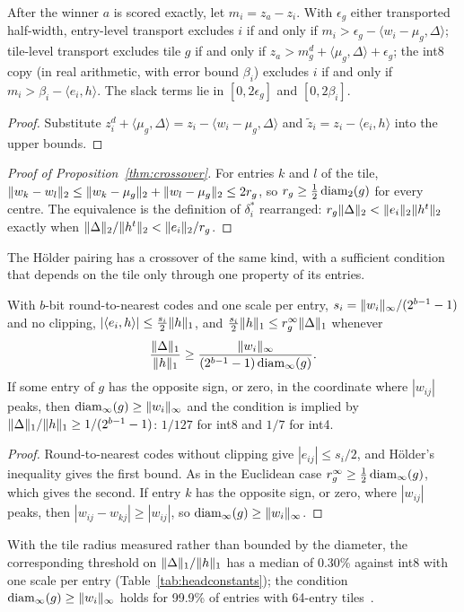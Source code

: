\begin{proposition}\label{prop:exclusion}
After the winner $a$ is scored exactly, let $m_i=z_a-z_i$. With $\epsilon_g$ either transported half-width, entry-level transport excludes $i$ if and only if $m_i>\epsilon_g-\langle w_i-\mu_g,\Delta\rangle$; tile-level transport excludes tile $g$ if and only if $z_a>m^d_g+\langle\mu_g,\Delta\rangle+\epsilon_g$; the int8 copy (in real arithmetic, with error bound $\beta_i$) excludes $i$ if and only if $m_i>\beta_i-\langle e_i,h\rangle$. The slack terms lie in $[0,2\epsilon_g]$ and $[0,2\beta_i]$.
\end{proposition}
\begin{proof}
Substitute $z_i^d+\langle\mu_g,\Delta\rangle=z_i-\langle w_i-\mu_g,\Delta\rangle$ and $\tilde z_i=z_i-\langle e_i,h\rangle$ into the upper bounds.
\end{proof}

\begin{proof}[Proof of Proposition~\ref{thm:crossover}]
For entries $k$ and $l$ of the tile, $\lVert w_k-w_l\rVert_2\le\lVert w_k-\mu_g\rVert_2+\lVert w_l-\mu_g\rVert_2\le2r_g$, so $r_g\ge\frac12\operatorname{diam}_2(g)$ for every centre. The equivalence is the definition of $\delta^\ast_i$ rearranged: $r_g\lVert \Delta\rVert_2<\lVert e_i\rVert_2\lVert h^t\rVert_2$ exactly when $\lVert \Delta\rVert_2/\lVert h^t\rVert_2<\lVert e_i\rVert_2/r_g$.
\end{proof}
The Hölder pairing has a crossover of the same kind, with a sufficient condition that depends on the tile only through one property of its entries.
\begin{proposition}\label{prop:holder-crossover}
With $b$-bit round-to-nearest codes and one scale per entry, $s_i=\lVert w_i\rVert_\infty/(2^{b-1}-1)$ and no clipping, $|\langle e_i,h\rangle|\le\tfrac{s_i}2\lVert h\rVert_1$, and $\tfrac{s_i}2\lVert h\rVert_1\le r^\infty_g\lVert \Delta\rVert_1$ whenever
\[\frac{\lVert \Delta\rVert_1}{\lVert h\rVert_1}\ge\frac{\lVert w_i\rVert_\infty}{(2^{b-1}-1)\operatorname{diam}_\infty(g)}.\]
If some entry of $g$ has the opposite sign, or zero, in the coordinate where $|w_{ij}|$ peaks, then $\operatorname{diam}_\infty(g)\ge\lVert w_i\rVert_\infty$ and the condition is implied by $\lVert \Delta\rVert_1/\lVert h\rVert_1\ge1/(2^{b-1}-1)$: $1/127$ for int8 and $1/7$ for int4.
\end{proposition}
\begin{proof}
Round-to-nearest codes without clipping give $|e_{ij}|\le s_i/2$, and Hölder's inequality gives the first bound. As in the Euclidean case $r^\infty_g\ge\frac12\operatorname{diam}_\infty(g)$, which gives the second. If entry $k$ has the opposite sign, or zero, where $|w_{ij}|$ peaks, then $|w_{ij}-w_{kj}|\ge|w_{ij}|$, so $\operatorname{diam}_\infty(g)\ge\lVert w_i\rVert_\infty$.
\end{proof}
With the tile radius measured rather than bounded by the diameter, the corresponding threshold on $\lVert \Delta\rVert_1/\lVert h\rVert_1$ has a median of 0.30\% against int8 with one scale per entry (Table~\ref{tab:headconstants}); the condition $\operatorname{diam}_\infty(g)\ge\lVert w_i\rVert_\infty$ holds for 99.9\% of entries with 64-entry tiles~.


